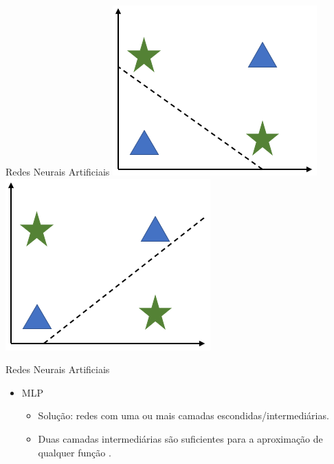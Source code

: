 \documentclass{libs/ufc_format}
\begin{document}
\begin{frame}{Redes Neurais Artificiais}
    \includegraphics[scale=0.4]{media/perceptron_3}
    \includegraphics[scale=0.4]{media/perceptron_4}
\end{frame}

\begin{frame}{Redes Neurais Artificiais}
    \begin{itemize}
        \item MLP
            \begin{itemize}
                \justifying
                \item Solução: redes com uma ou mais camadas escondidas/intermediárias.
                \item<2-> Duas camadas intermediárias são suficientes para a aproximação de qualquer função \cite{blc00}.
            \end{itemize}
    \end{itemize}
    \centering
\end{frame}
\end{document}
